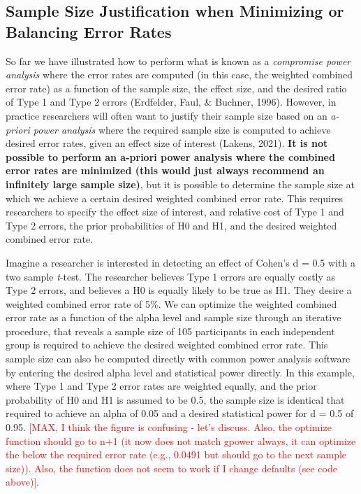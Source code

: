 \documentclass[
  english,
  ,jou, a4paper,floatsintext]{apa6}
\begin{document}
\hypertarget{sample-size-justification-when-minimizing-or-balancing-error-rates}{%
\subsection{Sample Size Justification when Minimizing or Balancing Error Rates}\label{sample-size-justification-when-minimizing-or-balancing-error-rates}}

So far we have illustrated how to perform what is known as a \emph{compromise power analysis} where the error rates are computed (in this case, the weighted combined error rate) as a function of the sample size, the effect size, and the desired ratio of Type 1 and Type 2 errors (Erdfelder, Faul, \& Buchner, 1996). However, in practice researchers will often want to justify their sample size based on an \emph{a-priori power analysis} where the required sample size is computed to achieve desired error rates, given an effect size of interest (Lakens, 2021). \textbf{It is not possible to perform an a-priori power analysis where the combined error rates are minimized (this would just always recommend an infinitely large sample size)}, but it is possible to determine the sample size at which we achieve a certain desired weighted combined error rate. This requires researchers to specify the effect size of interest, and relative cost of Type 1 and Type 2 errors, the prior probabilities of H0 and H1, and the desired weighted combined error rate.

Imagine a researcher is interested in detecting an effect of Cohen's d = 0.5 with a two sample \emph{t}-test. The researcher believes Type 1 errors are equally costly as Type 2 errors, and believes a H0 is equally likely to be true as H1. They desire a weighted combined error rate of 5\%. We can optimize the weighted combined error rate as a function of the alpha level and sample size through an iterative procedure, that reveals a sample size of 105 participants in each independent group is required to achieve the desired weighted combined error rate. This sample size can also be computed directly with common power analysis software by entering the desired alpha level and statistical power directly. In this example, where Type 1 and Type 2 error rates are weighted equally, and the prior probability of H0 and H1 is assumed to be 0.5, the sample size is identical that required to achieve an alpha of 0.05 and a desired statistical power for d = 0.5 of 0.95. \textcolor{red}{[MAX, I think the figure is confusing - let's discuss. Also, the optimize function should go to n+1 (it now does not match gpower always, it can optimize the below the required error rate (e.g., 0.0491 but should go to the next sample size)). Also, the function does not seem to work if I change defaults (see code above)]}.
\end{document}
